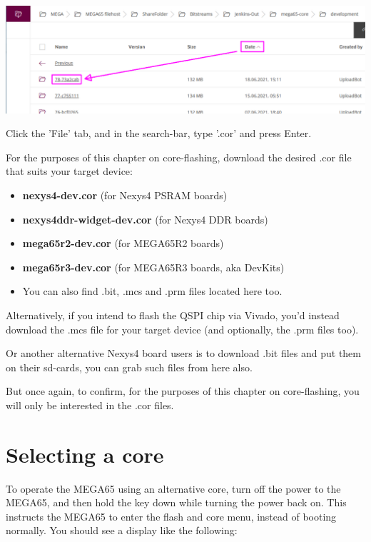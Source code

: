 \includegraphics[width=\linewidth]{images/latest_bitstream.png}

Click the 'File' tab, and in the search-bar, type '.cor' and press Enter.

For the purposes of this chapter on core-flashing, download the desired .cor file that suits your target device:

\begin{itemize}
  \item{\textbf{nexys4-dev.cor} (for Nexys4 PSRAM boards)}
  \item{\textbf{nexys4ddr-widget-dev.cor} (for Nexys4 DDR boards)}
  \item{\textbf{mega65r2-dev.cor} (for MEGA65R2 boards)}
  \item{\textbf{mega65r3-dev.cor} (for MEGA65R3 boards, aka DevKits)}
  \item{You can also find .bit, .mcs and .prm files located here too.}
\end{itemize}

Alternatively, if you intend to flash the QSPI chip via Vivado, you'd instead download the .mcs file for your target device (and optionally, the .prm files too).

Or another alternative Nexys4 board users is to download .bit files and put them on their sd-cards, you can grab such files from here also.

But once again, to confirm, for the purposes of this chapter on core-flashing, you will only be interested in the .cor files.

\section{Selecting a core}

To operate the MEGA65 using an alternative core, turn off the power to the MEGA65, and then hold the
 key down while turning the power back on.  This instructs the MEGA65 to enter the
flash and core menu, instead of booting normally.  You should see a display like the following:


